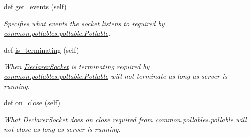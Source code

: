 \begin{DoxyCompactItemize}
def \hyperlink{class_r_a_i_d5_1_1block__device_1_1pollables_1_1declarer__socket_1_1_declarer_socket_af352950a82cb5b16a342af8025a29c8a}{get\+\_\+events} (self)
\begin{DoxyCompactList}\small\item\em Specifies what events the socket listens to required by \hyperlink{class_r_a_i_d5_1_1common_1_1pollables_1_1pollable_1_1_pollable}{common.\+pollables.\+pollable.\+Pollable}. \end{DoxyCompactList}\item 
\mbox{\label{class_r_a_i_d5_1_1block__device_1_1pollables_1_1declarer__socket_1_1_declarer_socket_a1dd67d80155aa3136dfcc719c9b3977d}} 
def \hyperlink{class_r_a_i_d5_1_1block__device_1_1pollables_1_1declarer__socket_1_1_declarer_socket_a1dd67d80155aa3136dfcc719c9b3977d}{is\+\_\+terminating} (self)
\begin{DoxyCompactList}\small\item\em When \hyperlink{class_r_a_i_d5_1_1block__device_1_1pollables_1_1declarer__socket_1_1_declarer_socket}{Declarer\+Socket} is terminating required by \hyperlink{class_r_a_i_d5_1_1common_1_1pollables_1_1pollable_1_1_pollable}{common.\+pollables.\+pollable.\+Pollable} will not terminate as long as server is running. \end{DoxyCompactList}\item 
\mbox{\label{class_r_a_i_d5_1_1block__device_1_1pollables_1_1declarer__socket_1_1_declarer_socket_ade8b017d1d5495b3389205af00303067}} 
def \hyperlink{class_r_a_i_d5_1_1block__device_1_1pollables_1_1declarer__socket_1_1_declarer_socket_ade8b017d1d5495b3389205af00303067}{on\+\_\+close} (self)
\begin{DoxyCompactList}\small\item\em What \hyperlink{class_r_a_i_d5_1_1block__device_1_1pollables_1_1declarer__socket_1_1_declarer_socket}{Declarer\+Socket} does on close required from common.\+pollables.\+pollable will not close as long as server is running. \end{DoxyCompactList}\item 
\mbox{\label{class_r_a_i_d5_1_1block__device_1_1pollables_1_1declarer__socket_1_1_declarer_socket_ae5cf6477968fe119eed756e117ed2db2}} 

\end{DoxyCompactItemize}
